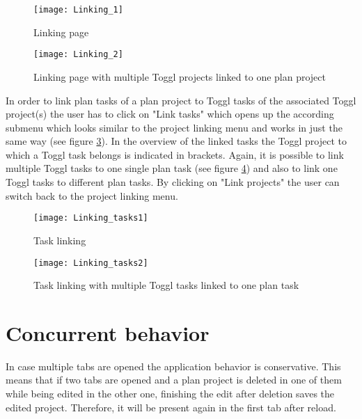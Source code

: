 \begin{figure}[H]
	\centering
	\texttt{[image: Linking\_1]}
	\caption{Linking page}
	\label{Linking init}
\end{figure}

\begin{figure}[H]
	\centering
	\texttt{[image: Linking\_2]}
	\caption{Linking page with multiple Toggl projects linked to one plan project}
	\label{Linking multiple}
\end{figure}

In order to link plan tasks of a plan project to Toggl tasks of the associated Toggl project(s) the user has to click on "Link tasks" which opens up the according submenu which looks similar to the project linking menu and works in just the same way (see figure \ref{Linking tasks init}). In the overview of the linked tasks the Toggl project to which a Toggl task belongs is indicated in brackets. Again, it is possible to link multiple Toggl tasks to one single plan task (see figure \ref{Linking tasks multiple}) and also to link one Toggl tasks to different plan tasks. By clicking on "Link projects" the user can switch back to the project linking menu.

\begin{figure}[H]
	\centering
	\texttt{[image: Linking\_tasks1]}
	\caption{Task linking}
	\label{Linking tasks init}
\end{figure}

\begin{figure}[H]
	\centering
	\texttt{[image: Linking\_tasks2]}
	\caption{Task linking with multiple Toggl tasks linked to one plan task}
	\label{Linking tasks multiple}
\end{figure}

\section{Concurrent behavior}
In case multiple tabs are opened the application behavior is conservative. This means that if two tabs are opened and a plan project is deleted in one of them while being edited in the other one, finishing the edit after deletion saves the edited project. Therefore, it will be present again in the first tab after reload.